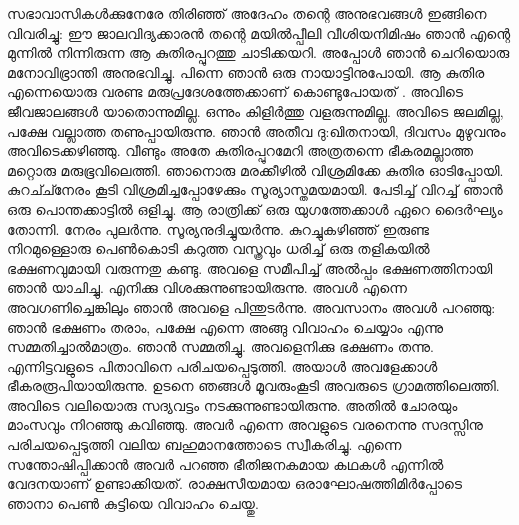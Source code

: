 സഭാവാസികള്‍ക്കുനേരേ തിരിഞ്ഞ്‌ അദേഹം തന്റെ അനുഭവങ്ങള്‍ ഇങ്ങിനെ വിവരിച്ചു: ഈ ജാലവിദ്യക്കാരന്‍ തന്റെ മയില്‍പ്പീലി വീശിയനിമിഷം ഞാന്‍ എന്റെ മുന്നില്‍ നിന്നിരുന്ന ആ കുതിരപ്പുറത്തു ചാടിക്കയറി. അപ്പോള്‍ ഞാന്‍ ചെറിയൊരു മനോവിഭ്രാന്തി അനുഭവിച്ചു. പിന്നെ ഞാന്‍ ഒരു നായാട്ടിനുപോയി. ആ കുതിര എന്നെയൊരു വരണ്ട മരുപ്രദേശത്തേക്കാണ്  കൊണ്ടുപോയത് . അവിടെ ജീവജാലങ്ങള്‍ യാതൊന്നുമില്ല. ഒന്നും കിളിര്‍ത്തു വളരുന്നുമില്ല. അവിടെ ജലമില്ല, പക്ഷേ വല്ലാത്ത തണുപ്പായിരുന്നു. ഞാന്‍ അതീവ ദു:ഖിതനായി, ദിവസം മുഴുവനും അവിടെക്കഴിഞ്ഞു. വീണ്ടും അതേ കുതിരപ്പുറമേറി അത്രതന്നെ ഭീകരമല്ലാത്ത മറ്റൊരു മരുഭൂവിലെത്തി. ഞാനൊരു മരക്കീഴില്‍ വിശ്രമിക്കേ കുതിര ഓടിപ്പോയി. കുറച്ച്നേരം കൂടി വിശ്രമിച്ചപ്പോഴേക്കും സൂര്യാസ്തമയമായി. പേടിച്ച്‌ വിറച്ച് ഞാന്‍ ഒരു പൊന്തക്കാട്ടില്‍ ഒളിച്ചു. ആ രാത്രിക്ക്‌ ഒരു യുഗത്തേക്കാള്‍ ഏറെ ദൈര്‍ഘ്യം തോന്നി. നേരം പുലര്‍ന്നു. സൂര്യനുദിച്ചുയര്‍ന്നു. കുറച്ചുകഴിഞ്ഞ്‌ ഇരുണ്ട നിറമുള്ളൊരു പെണ്‍കൊടി കറുത്ത വസ്ത്രവും ധരിച്ച്‌ ഒരു തളികയില്‍ ഭക്ഷണവുമായി വരുന്നതു കണ്ടു. അവളെ സമീപിച്ച്‌ അല്‍പ്പം ഭക്ഷണത്തിനായി ഞാന്‍ യാചിച്ചു. എനിക്കു വിശക്കുന്നുണ്ടായിരുന്നു. അവള്‍ എന്നെ അവഗണിച്ചെങ്കിലും ഞാന്‍ അവളെ പിന്തുടര്‍ന്നു. അവസാനം അവള്‍ പറഞ്ഞു: ഞാന്‍ ഭക്ഷണം തരാം, പക്ഷേ എന്നെ അങ്ങു വിവാഹം ചെയ്യാം എന്നു സമ്മതിച്ചാല്‍മാത്രം. ഞാന്‍ സമ്മതിച്ചു. അവളെനിക്കു ഭക്ഷണം തന്നു. എന്നിട്ടവളുടെ പിതാവിനെ പരിചയപ്പെടുത്തി. അയാള്‍ അവളേക്കാള്‍ ഭീകരരൂപിയായിരുന്നു. ഉടനെ ഞങ്ങള്‍ മൂവരുംകൂടി അവരുടെ ഗ്രാമത്തിലെത്തി. അവിടെ വലിയൊരു സദ്യവട്ടം നടക്കുന്നുണ്ടായിരുന്നു. അതില്‍ ചോരയും മാംസവും നിറഞ്ഞു കവിഞ്ഞു. അവര്‍ എന്നെ അവളുടെ വരനെന്നു സദസ്സിനു  പരിചയപ്പെടുത്തി വലിയ ബഹുമാനത്തോടെ സ്വീകരിച്ചു. എന്നെ സന്തോഷിപ്പിക്കാന്‍ അവര്‍ പറഞ്ഞ ഭീതിജനകമായ കഥകള്‍ എന്നില്‍  വേദനയാണ് ഉണ്ടാക്കിയത്. രാക്ഷസീയമായ ഒരാഘോഷത്തിമിര്‍പ്പോടെ ഞാനാ പെണ്‍ കുട്ടിയെ വിവാഹം ചെയ്തു. 

